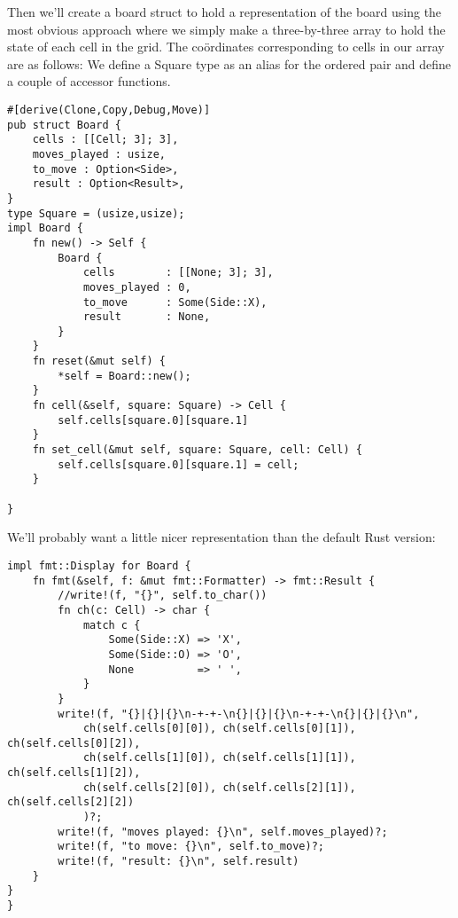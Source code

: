 \documentclass[10pt,dvipdfmx,letterpaper]{report}
\newcommand{\g}[1]{{\sc{#1}}\index{{\sc{#1}}}}
\begin{document}
Then we'll create a board struct to hold a representation of the board using
the most obvious approach where we simply make a three-by-three array to hold the
state of each cell in the \g{tic-tac-toe} grid.  The co\"ordinates corresponding to cells in our array
are as follows:
{\tiny{}}
We define a Square type as an alias for the ordered pair and define a couple of accessor functions.
{\scriptsize\begin{verbatim}
#[derive(Clone,Copy,Debug,Move)]
pub struct Board {
    cells : [[Cell; 3]; 3],
    moves_played : usize,
    to_move : Option<Side>,
    result : Option<Result>,
}
type Square = (usize,usize);
impl Board {
    fn new() -> Self {
        Board {
            cells        : [[None; 3]; 3],
            moves_played : 0,
            to_move      : Some(Side::X),
            result       : None,
        }
    }
    fn reset(&mut self) {
        *self = Board::new();
    }
    fn cell(&self, square: Square) -> Cell {
        self.cells[square.0][square.1]
    }
    fn set_cell(&mut self, square: Square, cell: Cell) {
        self.cells[square.0][square.1] = cell;
    }

}
\end{verbatim}}
We'll probably want a little nicer representation than the default Rust version:
{\scriptsize\begin{verbatim}
impl fmt::Display for Board {
    fn fmt(&self, f: &mut fmt::Formatter) -> fmt::Result {
        //write!(f, "{}", self.to_char())
        fn ch(c: Cell) -> char {
            match c {
                Some(Side::X) => 'X',
                Some(Side::O) => 'O',
                None          => ' ',
            }
        }
        write!(f, "{}|{}|{}\n-+-+-\n{}|{}|{}\n-+-+-\n{}|{}|{}\n",
            ch(self.cells[0][0]), ch(self.cells[0][1]), ch(self.cells[0][2]),
            ch(self.cells[1][0]), ch(self.cells[1][1]), ch(self.cells[1][2]),
            ch(self.cells[2][0]), ch(self.cells[2][1]), ch(self.cells[2][2])
            )?;
        write!(f, "moves played: {}\n", self.moves_played)?;
        write!(f, "to move: {}\n", self.to_move)?;
        write!(f, "result: {}\n", self.result)
    }
}
}
\end{verbatim}}
\end{document}
